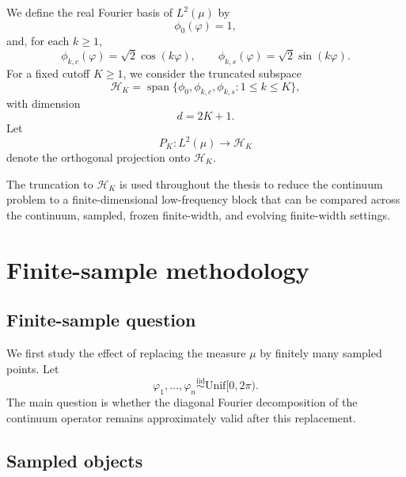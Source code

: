 We define the real Fourier basis of \(L^2(\mu)\) by
\begin{equation}
	\phi_0(\varphi)=1,
	\label{eq:method-fourier-basis-phi0}
\end{equation}
and, for each \(k\geq 1\),
\begin{equation}
	\phi_{k,c}(\varphi)=\sqrt{2}\cos(k\varphi),
	\qquad
	\phi_{k,s}(\varphi)=\sqrt{2}\sin(k\varphi).
	\label{eq:method-fourier-basis-modes}
\end{equation}
For a fixed cutoff \(K\geq 1\), we consider the truncated subspace
\begin{equation}
	\mathcal{H}_K=\operatorname{span}\{\phi_0,\phi_{k,c},\phi_{k,s}:1\leq k\leq K\},
	\label{eq:method-low-frequency-subspace}
\end{equation}
with dimension
\begin{equation}
	d=2K+1.
	\label{eq:method-block-dimension}
\end{equation}
Let
\begin{equation}
	P_K:L^2(\mu)\to \mathcal{H}_K
	\label{eq:method-projection-PK}
\end{equation}
denote the orthogonal projection onto $\mathcal H_K$.

The truncation to \(\mathcal{H}_K\) is used throughout the thesis to reduce the continuum problem to a
finite-dimensional low-frequency block that can be compared across the continuum, sampled,
frozen finite-width, and evolving finite-width settings.

\section{Finite-sample methodology}
\label{sec:finite-sample-methodology}

\subsection{Finite-sample question}

We first study the effect of replacing the measure \(\mu\) by finitely many sampled points. Let
\begin{equation}
	\varphi_1,\dots,\varphi_n \overset{\mathrm{iid}}{\sim} \mathrm{Unif}[0,2\pi).
	\label{eq:method-sampled-angles}
\end{equation}
The main question is whether the diagonal Fourier decomposition of the continuum operator
remains approximately valid after this replacement.

\subsection{Sampled objects}

